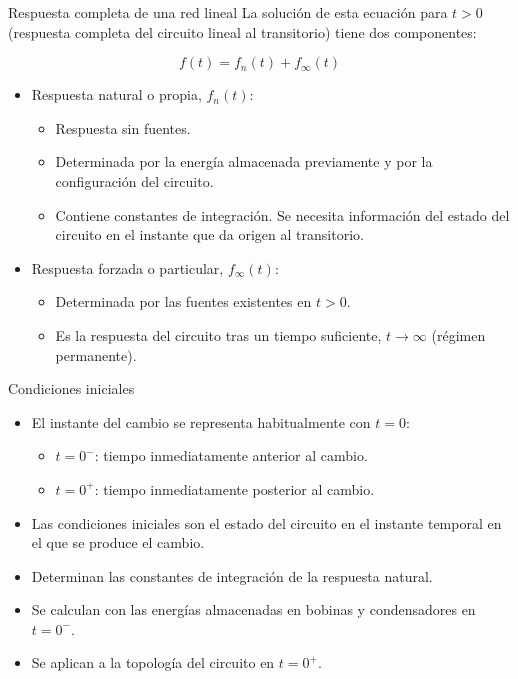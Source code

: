 \documentclass[aspectratio=169, usenames,svgnames,dvipsnames]{beamer}
\begin{document}
\begin{frame}[label={sec:org980d9ff}]{Respuesta completa de una red lineal}
La solución de esta ecuación para \(t > 0\) (respuesta completa del circuito lineal al transitorio) tiene dos componentes:

\[
 \boxed{f(t) = f_n(t) + f_\infty(t) }
 \]

\begin{itemize}
\item Respuesta \alert{natural} o propia, \(f_n(t)\):
\begin{itemize}
\item Respuesta sin fuentes.
\item Determinada por la energía almacenada previamente y por la configuración del circuito.
\item Contiene constantes de integración. Se necesita información del estado del circuito en el instante que da origen al transitorio.
\end{itemize}
\item Respuesta \alert{forzada} o particular, \(f_\infty(t)\):
\begin{itemize}
\item Determinada por las fuentes existentes en \(t > 0\).
\item Es la respuesta del circuito tras un tiempo suficiente, \(t \to \infty\) (régimen permanente).
\end{itemize}
\end{itemize}
\end{frame}

\begin{frame}[label={sec:orgbd51ed4}]{Condiciones iniciales}
\begin{itemize}
\item El instante del cambio se representa habitualmente con \(t = 0\):
\begin{itemize}
\item \(t = 0^-\): tiempo inmediatamente anterior al cambio.
\item \(t = 0^+\): tiempo inmediatamente posterior al cambio.
\end{itemize}

\item Las \alert{condiciones iniciales} son el estado del circuito en el instante temporal en el que se produce el cambio.

\item Determinan las \alert{constantes de integración} de la respuesta natural.

\item \alert{Se calculan} con las energías almacenadas en bobinas y condensadores en \(t = 0^-\).

\item \alert{Se aplican} a la topología del circuito en \(t = 0^+\).
\end{itemize}
\end{frame}
\end{document}
